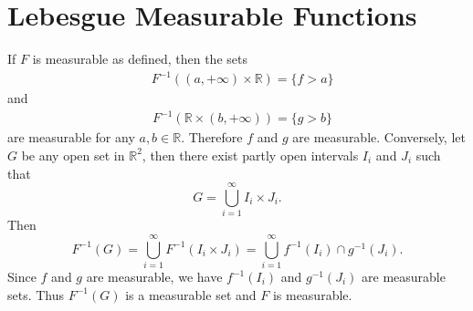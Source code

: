 \setcounter{section}{3}
\section{Lebesgue Measurable Functions}

\begin{exercise}{4.3}
  If $F$ is measurable as defined, then the sets
  \begin{align*}
    &F^{-1}((a,+\infty)\times\mathbb{R})=\{f>a\}
  \end{align*}
  and
  \begin{align*}
    &F^{-1}(\mathbb{R}\times(b,+\infty))=\{g>b\}
  \end{align*}
  are measurable for any $a,b\in\mathbb{R}.$
  Therefore $f$ and $g$ are measurable.
  Conversely, let $G$ be any open set in $\mathbb{R}^2$,
  then there exist partly open intervals $I_i$ and $J_i$ such that
  \[G=\bigcup_{i=1}^\infty I_i\times J_i.\]
  Then \[F^{-1}(G)=\bigcup_{i=1}^\infty F^{-1}(I_i\times J_i)=\bigcup_{i=1}^\infty f^{-1}(I_i)\cap g^{-1}(J_i).\]
  Since $f$ and $g$ are measurable,
  we have $f^{-1}(I_i)$ and $g^{-1}(J_i)$ are measurable sets.
  Thus $F^{-1}(G)$ is a measurable set and $F$ is measurable.
\end{exercise}

